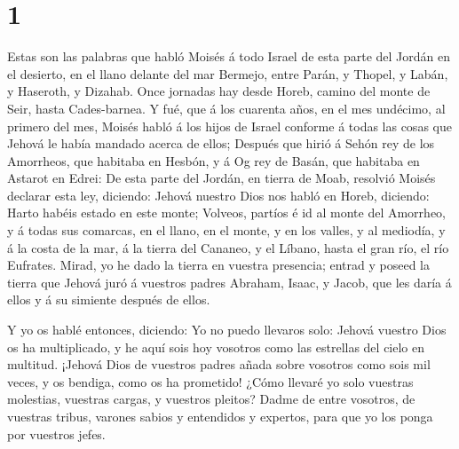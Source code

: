\hypertarget{section}{%
\section{1}\label{section}}

 Estas son las palabras que habló Moisés á todo Israel de
esta parte del Jordán en el desierto, en el llano delante del mar
Bermejo, entre Parán, y Thopel, y Labán, y Haseroth, y Dizahab.
 Once jornadas hay desde Horeb, camino del monte de Seir,
hasta Cades-barnea.  Y fué, que á los cuarenta años, en el
mes undécimo, al primero del mes, Moisés habló á los hijos de Israel
conforme á todas las cosas que Jehová le había mandado acerca de ellos;
 Después que hirió á Sehón rey de los Amorrheos, que
habitaba en Hesbón, y á Og rey de Basán, que habitaba en Astarot en
Edrei:  De esta parte del Jordán, en tierra de Moab,
resolvió Moisés declarar esta ley, diciendo:  Jehová nuestro
Dios nos habló en Horeb, diciendo: Harto habéis estado en este monte;
 Volveos, partíos é id al monte del Amorrheo, y á todas sus
comarcas, en el llano, en el monte, y en los valles, y al mediodía, y á
la costa de la mar, á la tierra del Cananeo, y el Líbano, hasta el gran
río, el río Eufrates.  Mirad, yo he dado la tierra en
vuestra presencia; entrad y poseed la tierra que Jehová juró á vuestros
padres Abraham, Isaac, y Jacob, que les daría á ellos y á su simiente
después de ellos.

 Y yo os hablé entonces, diciendo: Yo no puedo llevaros
solo:  Jehová vuestro Dios os ha multiplicado, y he aquí
sois hoy vosotros como las estrellas del cielo en multitud.
 ¡Jehová Dios de vuestros padres añada sobre vosotros como
sois mil veces, y os bendiga, como os ha prometido!  ¿Cómo
llevaré yo solo vuestras molestias, vuestras cargas, y vuestros pleitos?
 Dadme de entre vosotros, de vuestras tribus, varones
sabios y entendidos y expertos, para que yo los ponga por vuestros
jefes.

